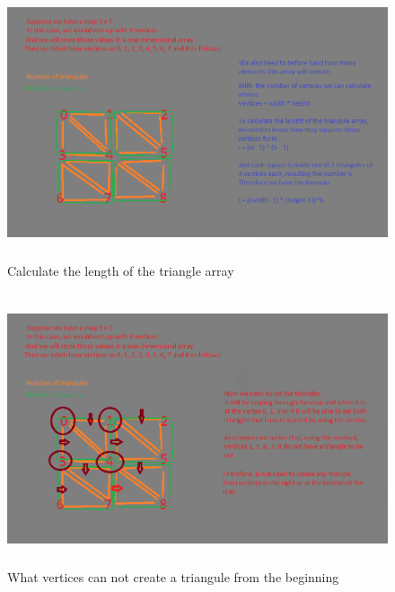 \documentclass[a4paper,12pt]{book}
\begin{document}
\begin{figure}
\begin{center}
\includegraphics[height=80mm]{mesh_research_5.png}
\end{center}
\caption{Calculate the length of the triangle array}
\label{fig:pretty}
\end{figure}

\begin{figure}
\begin{center}
\includegraphics[height=80mm]{mesh_research_6.png}
\end{center}
\caption{What vertices can not create a triangule from the beginning}
\label{fig:pretty}
\end{figure}
\end{document}

